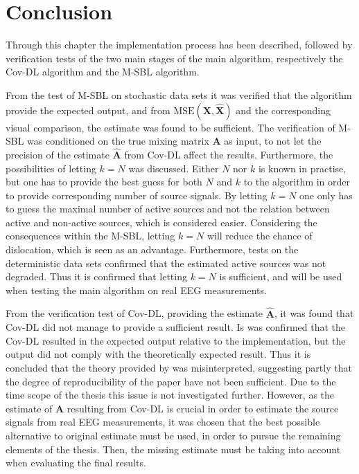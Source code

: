 \section{Conclusion}
Through this chapter the implementation process has been described, followed by verification tests of the two main stages of the main algorithm, respectively the Cov-DL algorithm and the M-SBL algorithm. 

From the test of M-SBL on stochastic data sets it was verified that the algorithm provide the expected output, and from $\text{MSE}(\mathbf{X}, \hat{\mathbf{X}})$ and the corresponding visual comparison, the estimate was found to be sufficient. 
The verification of M-SBL was conditioned on the true mixing matrix $\mathbf{A}$ as input, to not let the precision of the estimate $\hat{\mathbf{A}}$ from Cov-DL affect the results.  
Furthermore, the possibilities of letting $k = N$ was discussed. Either $N$ nor $k$ is known in practise, but one has to provide the best guess for both $N$ and $k$ to the algorithm in order to provide corresponding number of source signals. 
By letting $k = N$ one only has to guess the maximal number of active sources and not the relation between active and non-active sources, which is considered easier.  
Considering the consequences within the M-SBL, letting $k = N$ will reduce the chance of dislocation, which is seen as an advantage. 
Furthermore, tests on the deterministic data sets confirmed that the estimated active sources was not degraded. 
Thus it is confirmed that letting $k = N$ is sufficient, and will be used when testing the main algorithm on real EEG measurements.               

From the verification test of Cov-DL, providing the estimate $\hat{\mathbf{A}}$, it was found that Cov-DL did not manage to provide a sufficient result. 
Is was confirmed that the Cov-DL resulted in the expected output relative to the implementation, but the output did not comply with the theoretically expected result. 
Thus it is concluded that the theory provided by \cite{phd2015} was misinterpreted, suggesting partly that the degree of reproducibility of the paper have not been sufficient. 
Due to the time scope of the thesis this issue is not investigated further. 
However, as the estimate of $\mathbf{A}$ resulting from Cov-DL is crucial in order to estimate the source signals from real EEG measurements, it was chosen that the best possible alternative to original estimate must be used, in order to pursue the remaining elements of the thesis. 
Then, the missing estimate must be taking into account when evaluating the final results.

